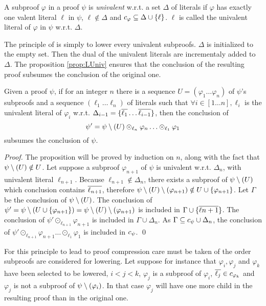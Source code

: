 \documentclass{llncs}
\begin{document}
\begin{definition}
A subproof $\varphi$ in a proof $\psi$ is \emph{univalent} w.r.t. a set $\Delta$ of literals if
$\varphi$ has exactly one valent literal $\ell$ in $\psi$, $\ell \notin \Delta$ and
$c_{\varphi} \subseteq \Delta \cup \left\{ \ell \right\}$. $\ell$ is called the univalent
literal of $\varphi$ in $\psi$ w.r.t.  $\Delta$.
\end{definition}

The principle of {\LowerUnivalents} is simply to lower every univalent subproofs. $\Delta$ is
initialized to the empty set. Then the dual of the univalent literals are incrementaly added to
$\Delta$. The proposition \ref{prop:LUniv} ensures that the conclusion of the resulting proof
subsumes the conclusion of the original one.

\begin{proposition} \label{prop:LUniv}
Given a proof $\psi$, if for an integer $n$ there is a sequence $U = (\varphi_1 \ldots \varphi_n)$
of $\psi$'s subproofs and a sequence $(\ell_1 \ldots \ell_n)$ of literals such that $\forall i \in
[1 \ldots n], \ell_i$ is the univalent literal of $\varphi_i$ w.r.t. $\Delta_{i-1} = \{\overline{\ell_1}
\ldots \overline{\ell_{i-1}}\}$, then the conclusion of
$$ \psi' = \psi \setminus (U) \odot_{\ell_n} \varphi_n \ldots \odot_{\ell_1} \varphi_1 $$
subsumes the conclusion of $\psi$.
\end{proposition}

\begin{proof}
The proposition will be proved by induction on $n$, along with the fact that $\psi \setminus (U) \notin
U$. Let suppose a subproof $\varphi_{n+1}$ of $\psi$ is univalent w.r.t. $\Delta_n$, with univalent
literal $\ell_{n+1}$.  Because $\ell_{n+1} \notin \Delta_n$, there exists a subproof of
$\psi \setminus (U)$ which conclusion contains $\overline{\ell_{n+1}}$, therefore
$\psi \setminus (U) \setminus (\varphi_{n+1}) \notin U \cup \{\varphi_{n+1}\}$.  Let $\Gamma$ be the conclusion
of $\psi \setminus (U)$. The conclusion of $ \psi' = \psi \setminus (U \cup \{\varphi_{n+1}\}) =
\psi \setminus (U) \setminus (\varphi_{n+1}) $ is included in $\Gamma \cup \{\overline{\ell{n+1}}\}$. The conclusion
of $\psi' \odot_{\ell_{n+1}} \varphi_{n+1}$ is included in $\Gamma \cup \Delta_n$. As $\Gamma
\subseteq c_{\psi} \cup \Delta_n$, the conclusion of $\psi' \odot_{\ell_{n+1}}
\varphi_{n+1} \ldots \odot_{\ell_1} \varphi_1$ is included in $c_{\psi}$. \qed
\end{proof}

For this principle to lead to proof compression care must be taken of the order subproofs are
considered for lowering. Let suppose for instance that $\varphi_i, \varphi_j$ and $\varphi_k$ have
been selected to be lowered, $i < j < k$, $\varphi_j$ is a subproof of $\varphi_i$, $\overline{\ell_j}
\in c_{\varphi_k}$ and $\varphi_j$ is not a subproof of $\psi \setminus (\varphi_i)$. In that
case $\varphi_j$ will have one more child in the resulting proof than in the original one.
\end{document}
